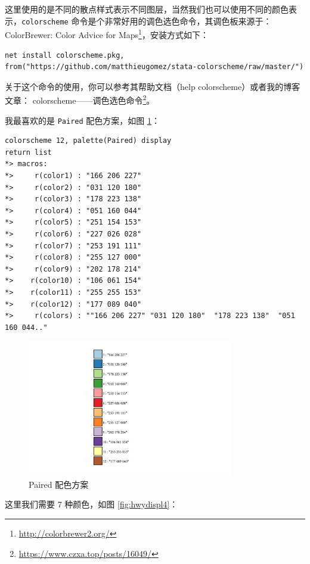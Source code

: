 \documentclass[]{ctexbook}
\renewcommand{\href}[2]{#2\footnote{\url{#1}}}
\begin{document}
这里使用的是不同的散点样式表示不同图层，当然我们也可以使用不同的颜色表示，\texttt{colorscheme} 命令是个非常好用的调色选色命令，其调色板来源于： \href{http://colorbrewer2.org/}{ColorBrewer: Color Advice for Maps}，安装方式如下：

\begin{lstlisting}
net install colorscheme.pkg, from("https://github.com/matthieugomez/stata-colorscheme/raw/master/")
\end{lstlisting}

关于这个命令的使用，你可以参考其帮助文档（help colorscheme）或者我的博客文章： \href{https://www.czxa.top/posts/16049/}{colorscheme------调色选色命令}。

我最喜欢的是 \texttt{Paired} 配色方案，如图 \ref{fig:Paired}：

\begin{lstlisting}
colorscheme 12, palette(Paired) display
return list
*> macros:
*>     r(color1) : "166 206 227"
*>     r(color2) : "031 120 180"
*>     r(color3) : "178 223 138"
*>     r(color4) : "051 160 044"
*>     r(color5) : "251 154 153"
*>     r(color6) : "227 026 028"
*>     r(color7) : "253 191 111"
*>     r(color8) : "255 127 000"
*>     r(color9) : "202 178 214"
*>    r(color10) : "106 061 154"
*>    r(color11) : "255 255 153"
*>    r(color12) : "177 089 040"
*>     r(colors) : ""166 206 227" "031 120 180"  "178 223 138"  "051 160 044.."
\end{lstlisting}

\begin{figure}

{\centering \includegraphics[width=0.8\textwidth]{assets/Paired} 

}

\caption{Paired 配色方案}\label{fig:Paired}
\end{figure}

这里我们需要 7 种颜色，如图 \ref{fig:hwydispl4}：
\end{document}
